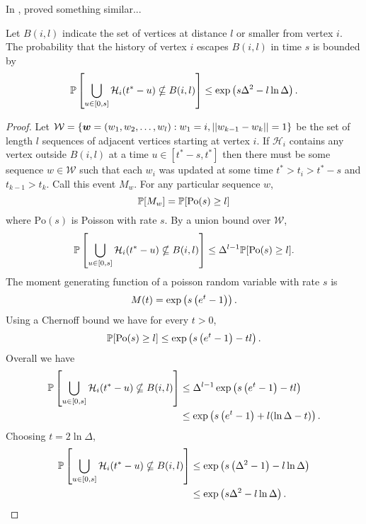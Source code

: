 In \cite{Lubetzky2016-wd}, \citeauthor{Lubetzky2016-wd} proved something similar...
	\begin{lemma}
	\label{lem:prob history contained in ball}
		Let $B(i, l)$ indicate the set of vertices at distance $l$ or smaller from vertex $i$. The probability that the history of vertex $i$ escapes $B(i,l)$ in time $s$ is bounded by
		\begin{equation}
			\mathbb{P}\left[\bigcup_{u \in [0, s]}\mathcal{H}_i(t^* - u) \nsubseteq B(i, l)\right] \leq \exp\left(s \Delta^2 - l \ln \Delta \right).
		\end{equation}
	\end{lemma}
	\begin{proof}
		Let $\mathcal{W} = \{{\bm{{w}}} = (w_1, w_2, \dots, w_l) : w_1 = i, ||w_{k-1} - w_k|| = 1\}$ be the set of length $l$ sequences of adjacent vertices starting at vertex $i$. If $\mathcal{H}_i$ contains any vertex outside $B(i, l)$ at a time $u \in [t^* - s, t^*]$ then there must be some sequence $w \in \mathcal{W}$ such that each $w_i$ was updated at some time $t^* > t_i > t^* - s$ and $t_{k-1} > t_k$. Call this event $M_w$. For any particular sequence $w$,
		\begin{equation}
			\mathbb{P}[M_w] = \mathbb{P}[\mathrm{Po}(s) \geq l]
		\end{equation}
		where $\mathrm{Po}(s)$ is Poisson with rate $s$. By a union bound over $\mathcal{W}$,
		\begin{equation}
			\mathbb{P}\left[\bigcup_{u \in [0, s]}\mathcal{H}_i(t^* - u) \nsubseteq B(i, l)\right] \leq \Delta^{l-1} \mathbb{P}[\mathrm{Po}(s) \geq l].
		\end{equation}
		The moment generating function of a poisson random variable with rate $s$ is
		\begin{equation}
			M(t) = \exp\left(s\left(e^t - 1\right)\right).
		\end{equation}
		Using a Chernoff bound we have for every $t > 0$,
		\begin{equation}
			\mathbb{P}[\mathrm{Po}(s) \geq l] \leq \exp\left(s\left(e^t - 1\right) - t l\right).
		\end{equation}
		Overall we have
		\begin{align}
			\mathbb{P}\left[\bigcup_{u \in [0, s]}\mathcal{H}_i(t^* - u) \nsubseteq B(i, l)\right] &\leq \Delta^{l-1} \exp\left(s\left(e^t - 1\right) - t l\right)\\
			&\leq \exp\left(s\left(e^t - 1\right) + l (\ln \Delta - t) \right).
		\end{align}
		Choosing $t = 2 \ln \Delta$,
		\begin{align}
			\mathbb{P}\left[\bigcup_{u \in [0, s]}\mathcal{H}_i(t^* - u) \nsubseteq B(i, l)\right] &\leq \exp\left(s\left(\Delta^2 - 1\right) - l \ln \Delta \right)\\
			&\leq \exp\left(s \Delta^2 - l \ln \Delta \right).
		\end{align}
	\end{proof}


